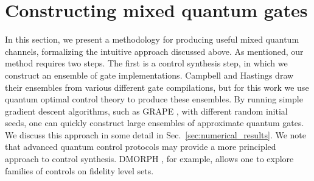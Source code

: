 \documentclass[aps,nofootinbib,pra,notitlepage,twocolumn]{revtex4-1}
\newcommand{\tr}{{\rm Tr\thinspace}}
\begin{document}










\section{Constructing mixed quantum gates}
\label{sec:mixed_unitary_processes}
\noindent In this section, we present a methodology for producing useful mixed quantum channels, formalizing the intuitive approach discussed above. As mentioned, our method requires two steps. The first is a control synthesis step, in which we construct an ensemble of gate implementations. Campbell and Hastings draw their ensembles from various different gate compilations, but for this work we use quantum optimal control theory to produce these ensembles. By running simple gradient descent algorithms, such as GRAPE \cite{Khaneja2005}, with different random initial seeds, one can quickly construct large ensembles of approximate quantum gates. We discuss this approach in some detail in Sec.~\ref{sec:numerical_results}. We note that advanced quantum control protocols may provide a more principled approach to control synthesis. DMORPH \cite{dominy2008exploring}, for example, allows one to explore families of controls on fidelity level sets.  
\end{document}

